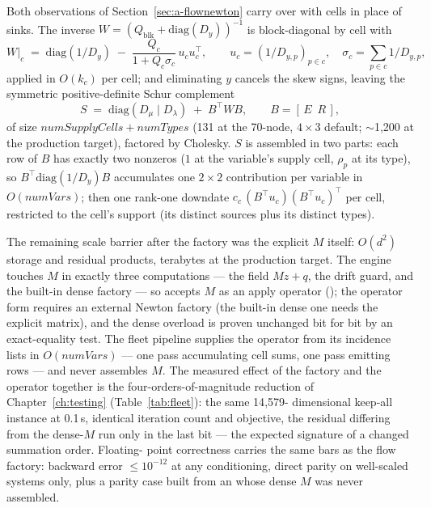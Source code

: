 Both observations of Section~\ref{sec:a-flownewton} carry over with cells
in place of sinks. The inverse
$W = (Q_{\mathrm{blk}} + \mathrm{diag}(D_y))^{-1}$ is block-diagonal by
cell with
\[
W|_c \;=\; \mathrm{diag}(1/D_y) \;-\;
\frac{Q_c}{1 + Q_c \sigma_c}\, u_c u_c^\top,
\qquad u_c = (1/D_{y,p})_{p \in c},\quad
\sigma_c = \textstyle\sum_{p \in c} 1/D_{y,p},
\]
applied in $O(k_c)$ per cell; and eliminating $y$ cancels the skew signs,
leaving the symmetric positive-definite Schur complement
\[
S \;=\; \mathrm{diag}(D_\mu \mid D_\lambda) \;+\; B^\top W B,
\qquad B = [\,E \;\ R\,],
\]
of size $\mathit{numSupplyCells} + \mathit{numTypes}$ (131 at the
70-node, $4 \times 3$ default; $\sim$1{,}200 at the production target),
factored by Cholesky. $S$ is assembled in two parts: each row of $B$ has
exactly two nonzeros ($1$ at the variable's supply cell, $\rho_p$ at its
type), so $B^\top \mathrm{diag}(1/D_y) B$ accumulates one $2 \times 2$
contribution per variable in $O(\mathit{numVars})$; then one rank-one
downdate $c_c\, (B^\top u_c)(B^\top u_c)^\top$ per cell, restricted to
the cell's support (its distinct sources plus its distinct types).

The remaining scale barrier after the factory was the explicit $M$
itself: $O(d^2)$ storage and residual products, terabytes at the
production target. The engine touches $M$ in exactly three computations
--- the field $Mz + q$, the  drift guard, and the
built-in dense factory --- so  accepts $M$ as an apply
operator (); the operator form requires an external
Newton factory (the built-in dense one needs the explicit matrix), and
the dense overload is proven unchanged bit for bit by an exact-equality
test. The fleet pipeline supplies the operator from its incidence lists
in $O(\mathit{numVars})$ --- one pass accumulating cell sums, one pass
emitting rows --- and never assembles $M$. The measured effect of the
factory and the operator together is the four-orders-of-magnitude
reduction of Chapter~\ref{ch:testing} (Table~\ref{tab:fleet}): the same 14{,}579-%
dimensional keep-all instance at 0.1\,s, identical iteration count and
objective, the residual differing from the dense-$M$ run only in the last
bit --- the expected signature of a changed summation order. Floating-%
point correctness carries the same bars as the flow factory: backward
error $\le 10^{-12}$ at any conditioning, direct parity on well-scaled
systems only, plus a parity case built from an  whose dense $M$
was never assembled.

